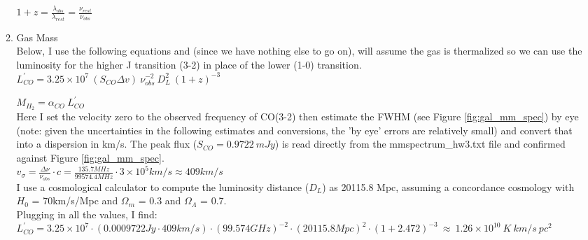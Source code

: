\documentclass[11pt]{article}
\begin{document}
\begin{enumerate}
\begin{enumerate}
	\hspace{10mm} $1 + z = \frac{\displaystyle\lambda_{obs}}{\displaystyle \lambda_{rest}} = \frac{\displaystyle\nu_{rest}}{\displaystyle \nu_{obs}}$\\
	
	
	
	\item Gas Mass%
	\\
	
	Below, I use the following equations and (since we have nothing else to go on), will assume the gas is thermalized so we can use the luminosity for the higher J transition (3-2) in place of the lower (1-0) transition.\\
	
	\hspace{10mm} $L^{'}_{CO} = 3.25 \times 10^{7}\ (S_{CO} \Delta v)\ \nu_{obs}^{-2}\ D_L^2\ (1+z)^{-3}$
	
	\hspace{10mm} $M_{H_2} = \alpha_{CO}\ L^{'}_{CO}$\\
	
	Here I set the velocity zero to the observed frequency of CO(3-2) then estimate the FWHM (see Figure \ref{fig:gal_mm_spec}) by eye (note: given the uncertainties in the following estimates and conversions, the 'by eye' errors are relatively small) and convert that into a dispersion in km/s. The peak flux ($S_{CO} = 0.9722\ mJy$) is read directly from the mmspectrum\_hw3.txt file and confirmed against Figure \ref{fig:gal_mm_spec}.\\
	
	\hspace{10mm} $v_{\sigma} = \frac{\displaystyle \Delta \nu}{\displaystyle \nu_{obs}} \cdot c = \frac{\displaystyle 135.7MHz}{\displaystyle 99574.4MHz} \cdot 3 \times 10^{5}km/s \approx 409 km/s$\\
	
	I use a cosmological calculator to compute the luminosity distance ($D_L$) as 20115.8 Mpc, assuming a concordance cosmology with $H_0$ = 70km/s/Mpc and $\Omega_m$ = 0.3 and $\Omega_{\Lambda}$ = 0.7.\\
	
	Plugging in all the values, I find:\\
	
	$L^{'}_{CO} = 3.25 \times 10^{7}\cdot(0.0009722 Jy \cdot 409 km/s)\cdot(99.574 GHz)^{-2}\cdot(20115.8 Mpc)^2\cdot(1+2.472)^{-3}\ \approx \ 1.26 \times 10^{10}\ K\ km/s\ pc^2$\\
	

\end{enumerate}
\end{enumerate}
\end{document}
